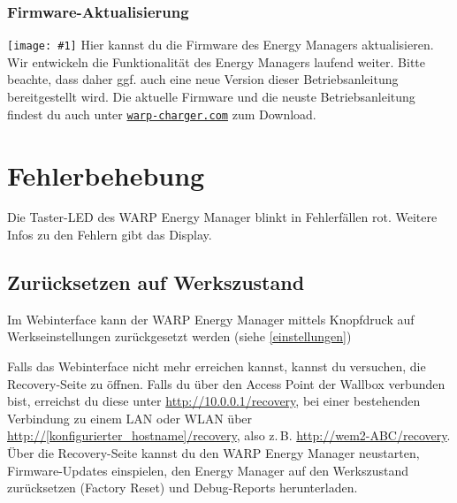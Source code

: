\documentclass[a4paper,10pt]{article}
\newcommand{\gfx}[1]{\texttt{[image: \#1]}}
\newcommand\rurl[2]{%
  \href{#1}{\nolinkurl{#2}}%
}
\begin{document}
\begin{multicols*}{2}
	\subsubsection{Firmware-Aktualisierung}
	\label{firmware-update}
	\gfx{./img/resized/web_firmware_update}
	Hier kannst du die Firmware des Energy Managers aktualisieren.
	Wir entwickeln die Funktionalität
	des Energy Managers laufend weiter. Bitte beachte, dass daher ggf. auch eine neue
	Version dieser Betriebsanleitung bereitgestellt wird.
	Die aktuelle Firmware und die neuste Betriebsanleitung findest du auch unter
	\rurl{https://warp-charger.com}{warp-charger.com} zum Download.

	\newpage
	\section{Fehlerbehebung}
	\label{fehlerbehebung}
	Die Taster-LED des WARP Energy Manager blinkt in Fehlerfällen rot. Weitere Infos zu den Fehlern gibt das Display.

    \subsection{Zurücksetzen auf Werkszustand}
    \label{werkszustand}

    Im Webinterface kann der WARP Energy Manager mittels Knopfdruck auf Werkseinstellungen zurückgesetzt werden (siehe \ref{einstellungen})

    Falls das Webinterface nicht mehr erreichen kannst, kannst du versuchen, die Recovery-Seite zu öffnen.
	Falls du über den Access Point der Wallbox verbunden bist, erreichst du diese unter \url{http://10.0.0.1/recovery},
	bei einer bestehenden Verbindung zu einem LAN oder WLAN über
	\url{http://[konfigurierter_hostname]/recovery}, also z.\,B. \url{http://wem2-ABC/recovery}.
	Über die Recovery-Seite kannst du den WARP Energy Manager neustarten, Firmware-Updates einspielen,
	den Energy Manager auf den Werkszustand zurücksetzen (Factory Reset) und Debug-Reports
	herunterladen.


\end{multicols*}
\end{document}
